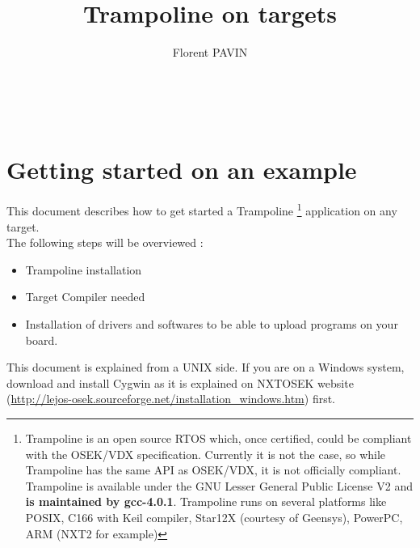 \documentclass[11pt]{manual} %
\title{Trampoline on targets}
\author{Florent PAVIN}
\begin{document}
\maketitle
~\newpage
\setcounter{tocdepth}{3}
\tableofcontents

\chapter{Getting started on an example}

This document describes how to get started a Trampoline \footnote{Trampoline is an open source RTOS which, once certified, could be compliant with the OSEK/VDX specification. Currently it is not the case, so while Trampoline has the same API as OSEK/VDX, it is not officially compliant. Trampoline is available under the GNU Lesser General Public License V2 and \textbf{is maintained by gcc-4.0.1}. Trampoline runs on several platforms like POSIX, C166 with Keil compiler, Star12X (courtesy of Geensys), PowerPC, ARM (NXT2 for example)} application on any target.\\
The following steps will be overviewed :
\begin{itemize}
\item Trampoline installation
\item Target Compiler needed
\item Installation of drivers and softwares to be able to upload programs on your board.
\end{itemize}
This document is explained from a UNIX side. If you are on a Windows system, download and install Cygwin as it is explained on NXTOSEK website (\href{http://lejos-osek.sourceforge.net/installation_windows.htm}{http://lejos-osek.sourceforge.net/installation\_windows.htm}) first.







\printindex
\end{document}
